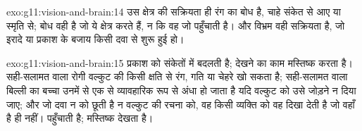 \begin{solution}{exo:g11:vision-and-brain:14}
उस क्षेत्र की सक्रियता ही रंग का बोध है, चाहे संकेत  से आए या स्मृति से;
बोध वही है जो ये क्षेत्र करते हैं, न कि वह जो  पहुँचाती है। और विभ्रम
वही सक्रियता है, जो इरादे या प्रकाश के बजाय किसी दवा से शुरू हुई हो।
\end{solution}

\begin{solution}{exo:g11:vision-and-brain:15}
 प्रकाश को संकेतों में बदलती है; देखने का काम मस्तिष्क करता है।
सही-सलामत  वाला रोगी वल्कुट की किसी क्षति से रंग, गति या चेहरे खो सकता
है; सही-सलामत  वाला बिल्ली का बच्चा उनमें से एक से व्यावहारिक रूप से
अंधा हो जाता है यदि वल्कुट को उसे जोड़ने न दिया जाए; और जो दवा न  को
छूती है न वल्कुट की रचना को, वह किसी व्यक्ति को वह दिखा देती है जो वहाँ है
ही नहीं।  पहुँचाती है; मस्तिष्क देखता है।
\end{solution}

